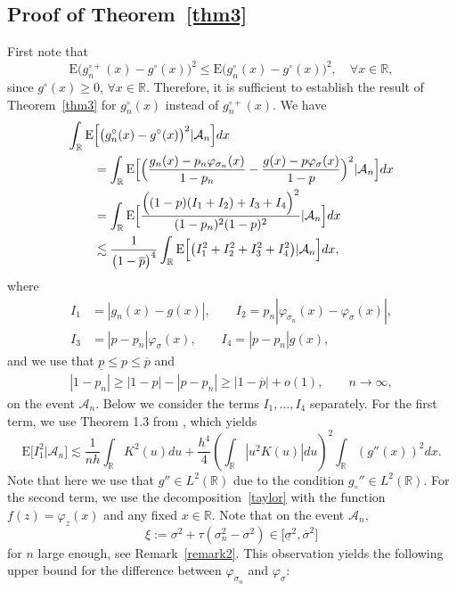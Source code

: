 \documentclass[a4paper,11pt]{article}
\theoremstyle{definition}
\newcommand{\R}{{\mathbb{R}}}
\newcommand{\1}{\mathbb{I}}
\newcommand{\A}{\mathscr{A}}
\renewcommand{\A}{\mathcal{A}}
\newcommand{\E}{{\mathrm E}}
\def\R{\mathbb{R}}
\theoremstyle{remark}
\begin{document}
\subsection{Proof of Theorem~\ref{thm3}}
First note that
\begin{equation*}
    \E\bigl(g^{\circ+}_{n}(x) - g^{\circ}(x)\bigr)^2 \leq \E\bigl(g^{\circ}_{n}(x) - g^{\circ}(x)\bigr)^2, \quad \forall x\in \R,
\end{equation*}
since $g^{\circ}(x) \geq 0$, $\forall x\in \R$. Therefore, it is sufficient to establish  the result of Theorem~\ref{thm3} for $g^{\circ}_{n}(x)$ instead of $g^{\circ+}_{n}(x)$. We have 
\begin{align*}
    \int_{\R} \E &\Bigl[ \bigl(g^{\circ}_{n} (x) - g^{\circ}(x)\bigr)^2 | \A_n\Bigr] dx \\
    &= \int_{\R} \E \Bigl[ \Bigl(\frac{g_n(x) - p_n\varphi_{\sigma_n}(x)}{1-p_n}- \frac{g(x) - p\varphi_{\sigma}(x)}{1-p}\Bigr)^2 | \A_n\Bigr]dx\\
    &= \int_{\R} \E \Bigl[ \frac{\Bigl((1 - p)(I_1 +I_2) +I_3 + I_4\Bigr)^2}{(1-p_n)^2(1-p)^2}| \A_n\Bigr] dx \\\ 
    &\lesssim \frac{1}{\bigl(1- \overline{p}\bigr)^4}\int_{\R} \E \Bigl[ \bigl(I_1^2 +I_2^2 + I_3^2 +I_4^2\bigr) |\A_n\Bigr] dx,
\end{align*}
where
\begin{align*}
    I_1 &= |g_n(x) - g(x)|, \qquad 
    I_2 = p_n |\varphi_{\sigma_n}(x) - \varphi_{\sigma}(x)|, \\
    I_3 &= |p-p_n|\varphi_{\sigma}(x),  \qquad 
    I_4 = |p - p_n|g(x),
\end{align*}
and we use that $\underline{p} \leq p \leq \overline{p}$ and 
\begin{eqnarray*}
|1-p_n| \geq |1-p| - |p-p_n| \geq |1-\overline{p}| +o(1), \qquad n \to \infty,
\end{eqnarray*}
on the event \(\A_n\).
Below we consider the terms  \(I_1,...,I_4\) separately. For the first term, we use Theorem 1.3 from \cite{Tsybakov}, which yields
\begin{equation}\label{thm3_proof2}
    \E \bigl[ I_1^2 | \A_n \bigr] \lesssim \frac{1}{nh}\int_{\R} K^2(u)du + \frac{h^4}{4}(\int_{\R}|u^2K(u)|du)^2\int_{\R}(g''(x))^2dx.
\end{equation}
Note that here we use that  \(g'' \in L^2(\R)\) due to the condition \(g_\circ'' \in L^2(\R).\)
For the second term, we use the  decomposition~\eqref{taylor} with the function \(f(z) = \varphi_{z}(x)\) and any fixed \(x \in \R\). Note that  on the event \(\A_n,\) $$ \xi := \sigma^2 + \tau(\sigma^2_n - \sigma^2) \in \bigl[ \underline{\sigma}^2, \overline{\sigma}^2 \bigr] $$for \(n\) large enough, see Remark~\ref{remark2}. This observation yields the following upper bound for the difference between \(\varphi_{\sigma_n}\) and  \(\varphi_{\sigma}\):
\end{document}

